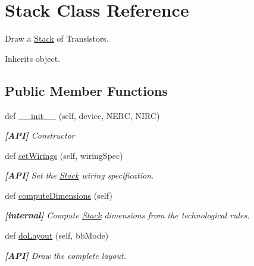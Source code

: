 \hypertarget{classpython_1_1stack_1_1Stack}{}\section{Stack Class Reference}
\label{classpython_1_1stack_1_1Stack}


Draw a \mbox{\hyperlink{classpython_1_1stack_1_1Stack}{Stack}} of Transistors.  




Inherits object.

\subsection*{Public Member Functions}
\begin{DoxyCompactItemize}
\item 
def \mbox{\hyperlink{classpython_1_1stack_1_1Stack_a818e80b2a75b3e0d06f9826d1c60ecab}{\+\_\+\+\_\+init\+\_\+\+\_\+}} (self, device, N\+E\+RC, N\+I\+RC)
\begin{DoxyCompactList}\small\item\em {\bfseries \mbox{[}A\+PI\mbox{]}} Constructor \end{DoxyCompactList}\item 
def \mbox{\hyperlink{classpython_1_1stack_1_1Stack_a4fa5741d1869983366b4ca96c3ae85b5}{set\+Wirings}} (self, wiring\+Spec)
\begin{DoxyCompactList}\small\item\em {\bfseries \mbox{[}A\+PI\mbox{]}} Set the \mbox{\hyperlink{classpython_1_1stack_1_1Stack}{Stack}} wiring specification. \end{DoxyCompactList}\item 
def \mbox{\hyperlink{classpython_1_1stack_1_1Stack_a74ff17e974efecc28c792db05b5d3eb0}{compute\+Dimensions}} (self)
\begin{DoxyCompactList}\small\item\em {\bfseries \mbox{[}internal\mbox{]}} Compute \mbox{\hyperlink{classpython_1_1stack_1_1Stack}{Stack}} dimensions from the technological rules. \end{DoxyCompactList}\item 
def \mbox{\hyperlink{classpython_1_1stack_1_1Stack_a2b936db85a32775dd3739ccfdfef636d}{do\+Layout}} (self, bb\+Mode)
\begin{DoxyCompactList}\small\item\em {\bfseries \mbox{[}A\+PI\mbox{]}} Draw the complete layout. \end{DoxyCompactList}\end{DoxyCompactItemize}


